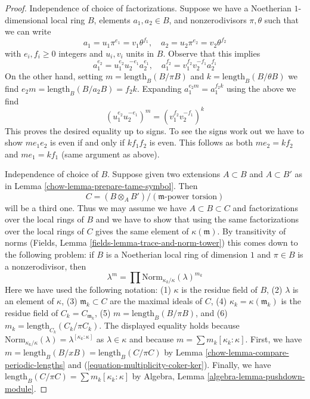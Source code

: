 \begin{proof}

Independence of choice of factorizations. Suppose we have
a Noetherian $1$-dimensional local ring $B$, elements $a_1, a_2 \in B$,
and nonzerodivisors $\pi, \theta$ such that we can write
$$
a_1 = u_1 \pi^{e_1} = v_1 \theta^{f_1},\quad
a_2 = u_2 \pi^{e_2} = v_2 \theta^{f_2}
$$
with $e_i, f_i \geq 0$ integers and $u_i, v_i$ units in $B$.
Observe that this implies
$$
a_1^{e_2} = u_1^{e_2}u_2^{-e_1}a_2^{e_1},\quad
a_1^{f_2} = v_1^{f_2}v_2^{-f_1}a_2^{f_1}
$$
On the other hand, setting
$m = \text{length}_B(B/\pi B)$ and $k = \text{length}_B(B/\theta B)$
we find $e_2 m = \text{length}_B(B/a_2 B) = f_2 k$.
Expanding $a_1^{e_2m} = a_1^{f_2 k}$ using the above we find
$$
(u_1^{e_2}u_2^{-e_1})^m =  (v_1^{f_2}v_2^{-f_1})^k
$$
This proves the desired equality up to signs. To see the signs
work out we have to show $me_1e_2$ is even if and only if
$kf_1f_2$ is even. This follows as both $me_2 = kf_2$ and
$me_1 = kf_1$ (same argument as above).

\medskip\noindent
Independence of choice of $B$. Suppose given two extensions
$A \subset B$ and $A \subset B'$ as in Lemma \ref{chow-lemma-prepare-tame-symbol}.
Then
$$
C = (B \otimes_A B')/(\mathfrak m\text{-power torsion})
$$
will be a third one. Thus we may assume we have
$A \subset B \subset C$ and factorizations over the
local rings of $B$ and we have to show that using
the same factorizations over the local rings of $C$
gives the same element of $\kappa(\mathfrak m)$.
By transitivity of norms
(Fields, Lemma \ref{fields-lemma-trace-and-norm-tower})
this comes down to the following problem:
if $B$ is a Noetherian local ring of dimension $1$
and $\pi \in B$ is a nonzerodivisor, then
$$
\lambda^m = \prod \text{Norm}_{\kappa_k/\kappa}(\lambda)^{m_k}
$$
Here we have used the following notation:
(1) $\kappa$ is the residue field of $B$,
(2) $\lambda$ is an element of $\kappa$,
(3) $\mathfrak m_k \subset C$ are the maximal ideals of $C$,
(4) $\kappa_k = \kappa(\mathfrak m_k)$ is the residue field of
$C_k = C_{\mathfrak m_k}$,
(5) $m = \text{length}_B(B/\pi B)$, and
(6) $m_k = \text{length}_{C_k}(C_k/\pi C_k)$.
The displayed equality holds because
$\text{Norm}_{\kappa_k/\kappa}(\lambda) = \lambda^{[\kappa_k : \kappa]}$
as $\lambda \in \kappa$ and because $m = \sum m_k[\kappa_k:\kappa]$.
First, we have $m = \text{length}_B(B/xB) = \text{length}_B(C/\pi C)$
by Lemma \ref{chow-lemma-compare-periodic-lengths}
and (\ref{equation-multiplicity-coker-ker}).
Finally, we have $\text{length}_B(C/\pi C) = \sum m_k[\kappa_k:\kappa]$
by Algebra, Lemma \ref{algebra-lemma-pushdown-module}.
\end{proof}

